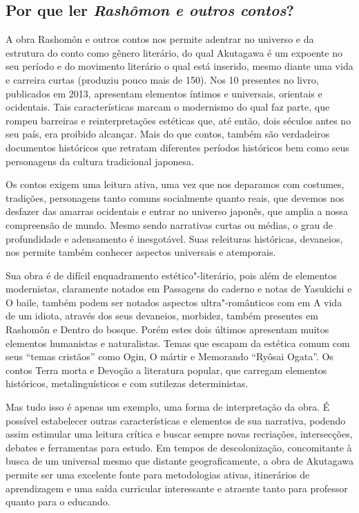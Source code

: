 \documentclass[12pt]{extarticle}
\begin{document}

\subsection{Por que ler \textit{Rashômon e outros contos}?}

A obra Rashomôn e outros contos nos permite adentrar no universo e da estrutura
do conto como gênero literário, do qual Akutagawa é um expoente no seu período
e do movimento literário o qual está inserido, mesmo diante uma vida e carreira
curtas (produziu pouco mais de 150).  Nos 10 presentes no livro, publicados em
2013, apresentam elementos íntimos e universais, orientais e ocidentais. Tais
características marcam o modernismo do qual faz parte, que rompeu barreiras e
reinterpretações estéticas que, até então, dois séculos antes no seu país, era
proibido alcançar. Mais do que contos, também são verdadeiros documentos
históricos que retratam diferentes períodos históricos bem como seus
personagens da cultura tradicional japonesa.



Os contos exigem uma leitura ativa, uma vez que nos deparamos com costumes,
tradições, personagens tanto comuns socialmente quanto reais, que devemos nos
desfazer das amarras ocidentais e entrar no universo japonês, que amplia a
nossa compreensão de mundo. Mesmo sendo narrativas curtas ou médias, o grau de
profundidade e adensamento é inesgotável.  Suas releituras históricas,
devaneios, nos permite também conhecer aspectos universais e atemporais.

Sua obra é de difícil enquadramento estético"-literário, pois além de elementos
modernistas, claramente notados em Passagens do caderno e notas de Yasukichi e
O baile, também podem ser notados aspectos ultra"-românticos com em A vida de
um idiota, através dos seus devaneios, morbidez, também presentes em Rashomôn e
Dentro do bosque. Porém estes dois últimos apresentam muitos elementos
humanistas e naturalistas.  Temas que escapam da estética comum com seus
``temas cristãos'' como Ogin, O mártir e Memorando ``Ryôsai Ogata''. Os contos
Terra morta e Devoção a literatura popular, que carregam elementos históricos,
metalinguísticos e com sutilezas deterministas.

Mas tudo isso é apenas um exemplo, uma forma de interpretação da obra. É
possível estabelecer outras características e elementos de sua narrativa,
podendo assim estimular uma leitura crítica e buscar sempre novas recriações,
intersecções, debates e ferramentas para estudo. Em tempos de descolonização,
concomitante à busca de um universal mesmo que distante geograficamente, a obra
de Akutagawa permite ser uma excelente fonte para metodologias ativas,
itinerários de aprendizagem e uma saída curricular interessante e atraente
tanto para professor quanto para o educando.
\end{document}
